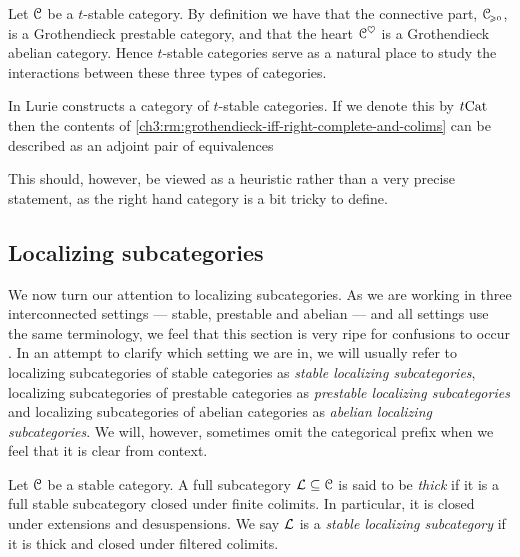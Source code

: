 \begin{remark}
    Let $\EuScript{C}$ be a $t$-stable category. By definition we have that the connective part, $\EuScript{C}_{\hspace{-1pt}\scriptscriptstyle\geqslant 0}$, is a Grothendieck prestable category, and that the heart $\EuScript{C}^\heartsuit$ is a Grothendieck abelian category. Hence $t$-stable categories serve as a natural place to study the interactions between these three types of categories. 
\end{remark}

\begin{remark}
    In \cite[Section C.3.1]{lurie_SAG} Lurie constructs a category of $t$-stable categories. If we denote this by $t\mathrm{Cat}$ then the contents of \cref{ch3:rm:grothendieck-iff-right-complete-and-colims} can be described as an adjoint pair of equivalences
    \begin{center}
    \end{center}
    This should, however, be viewed as a heuristic rather than a very precise statement, as the right hand category is a bit tricky to define. 
\end{remark}







\subsection{Localizing subcategories}
\label{ch3:ssec:localizing-subcategories}

We now turn our attention to localizing subcategories. As we are working in three interconnected settings --- stable, prestable and abelian --- and all settings use the same terminology, we feel that this section is very ripe for confusions to occur . In an attempt to clarify which setting we are in, we will usually refer to localizing subcategories of stable categories as \emph{stable localizing subcategories}, localizing subcategories of prestable categories as \emph{prestable localizing subcategories} and localizing subcategories of abelian categories as \emph{abelian localizing subcategories}. We will, however, sometimes omit the categorical prefix when we feel that it is clear from context. 

\begin{definition}
    Let $\EuScript{C}$ be a stable category. A full subcategory $\mathcal{L}\subseteq \EuScript{C}$ is said to be \emph{thick} if it is a full stable subcategory closed under finite colimits. In particular, it is closed under extensions and desuspensions. We say $\mathcal{L}$ is a \emph{stable localizing subcategory} if it is thick and closed under filtered colimits. 
\end{definition}

